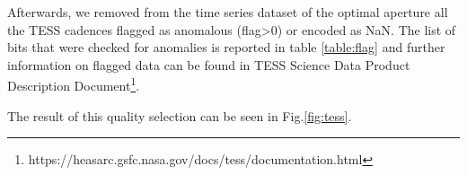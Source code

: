 \documentclass{aa}
\begin{document}
Afterwards, we removed from the time series dataset of the optimal aperture all the TESS cadences flagged as anomalous (flag>0) or encoded as NaN. The list of bits that were checked for anomalies is reported in table \ref{table:flag} and further information on flagged data can be found in TESS Science Data Product Description Document\footnote{https://heasarc.gsfc.nasa.gov/docs/tess/documentation.html}.
\begin{table}[h!]
   \centering
    \caption{Data quality flags}
\label{table:flag}
\end{table}
The result of this quality selection can be seen in Fig.\ref{fig:tess}.
\end{document}
